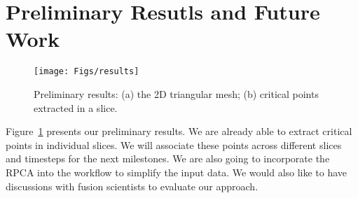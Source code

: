\section{Preliminary Resutls and Future Work}

\begin{figure}[!htb]
  \centering
  \texttt{[image: Figs/results]}
  \caption{Preliminary results: (a) the 2D triangular mesh; (b) critical points extracted in a slice.}
  \label{fig:results}
\end{figure}

Figure~\ref{fig:results} presents our preliminary results.  We are already able to extract critical points in individual slices.  We will associate these points across different slices and timesteps for the next milestones.  We are also going to incorporate the RPCA into the workflow to simplify the input data.  We would also like to have discussions with fusion scientists to evaluate our approach.  